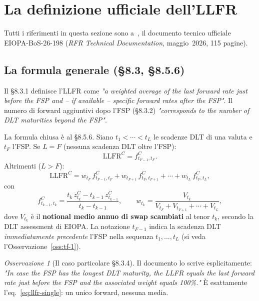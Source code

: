 \documentclass[11pt,a4paper]{article}
\theoremstyle{definition}
\theoremstyle{remark}
\newtheorem*{osservazione}{Osservazione}
\newcommand{\LLFR}{\mathrm{LLFR}}
\begin{document}
\section{La definizione ufficiale dell'LLFR}
\label{sec:doc-ufficiale}

Tutti i riferimenti in questa sezione sono a~\cite{eiopa2026}, il documento tecnico ufficiale
EIOPA-BoS-26-198 (\textit{RFR Technical Documentation}, maggio~2026, 115 pagine).

\subsection{La formula generale (§8.3, §8.5.6)}
\label{sec:formula-generale}

Il §8.3.1 definisce l'LLFR come \emph{"a weighted average of the last forward rate just before
the FSP and -- if available -- specific forward rates after the FSP"}. Il numero di forward
aggiuntivi dopo l'FSP (§8.3.2) \emph{"corresponds to the number of DLT maturities beyond the
FSP"}.

La formula chiusa \`e al §8.5.6. Siano $t_1<\cdots<t_L$ le scadenze DLT di una valuta e $t_F$
l'FSP. Se $L=F$ (nessuna scadenza DLT oltre l'FSP):
\begin{equation}
  \LLFR^C = f^C_{t_{F-1},t_F}.
  \label{eq:llfr-single}
\end{equation}
Altrimenti ($L>F$):
\begin{equation}
  \LLFR^C = w_{t_F}\,f^C_{t_{F-1},t_F} + w_{t_{F+1}}\,f^C_{t_F,t_{F+1}} + \cdots +
            w_{t_L}\,f^C_{t_F,t_L},
  \label{eq:llfr-weighted}
\end{equation}
con
\begin{equation}
  f^C_{t_{k-1},t_k} = \frac{t_k\,z^C_{t_k} - t_{k-1}\,z^C_{t_{k-1}}}{t_k-t_{k-1}},
  \qquad
  w_{t_k} = \frac{V_{t_k}}{V_{t_F}+V_{t_{F+1}}+\cdots+V_{t_L}},
  \label{eq:llfr-weights}
\end{equation}
dove $V_{t_k}$ \`e il \textbf{notional medio annuo di swap scambiati} al tenor $t_k$, secondo
la DLT assessment di EIOPA. La notazione $t_{F-1}$ indica la scadenza DLT \emph{immediatamente
precedente} l'FSP nella sequenza $t_1,\dots,t_L$ (si veda l'Osservazione~\ref{oss:tf-1}).

\begin{osservazione}[Il caso particolare §8.3.4]
\label{oss:caso-speciale}
Il documento lo scrive esplicitamente: \emph{"In case the FSP has the longest DLT maturity,
the LLFR equals the last forward rate just before the FSP and the associated weight equals
100\%."} È esattamente l'eq.~\eqref{eq:llfr-single}: un unico forward, nessuna media.
\end{osservazione}
\end{document}
